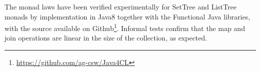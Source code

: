 \documentclass[runningheads]{llncs}
\begin{document}

The monad laws have been verified experimentally for SetTree and ListTree monads by implementation in Java8 together with the Functional Java\cite{FJ} libraries, with the source available on Github\footnote{\url{https://github.com/ag-csw/Java4CL}}. Informal tests confirm that the map and join operations are linear in the size of the collection, as expected.


%
%
\end{document}
